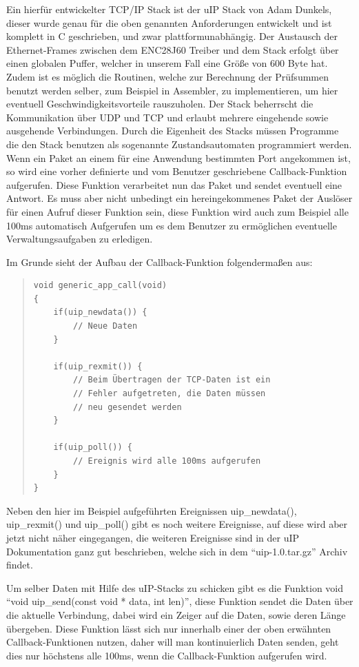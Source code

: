 \documentclass[a4paper,14pt,headsepline]{scrartcl}
\begin{document}
Ein hierfür entwickelter TCP/IP Stack ist der uIP Stack von Adam Dunkels, dieser wurde genau für die oben genannten Anforderungen entwickelt und ist komplett in C geschrieben, und zwar plattformunabhängig. Der Austausch der Ethernet-Frames zwischen dem ENC28J60 Treiber und dem Stack erfolgt über einen globalen Puffer, welcher in unserem Fall eine Größe von 600 Byte hat. Zudem ist es möglich die Routinen, welche zur Berechnung der Prüfsummen benutzt werden selber, zum Beispiel in Assembler, zu implementieren, um hier eventuell Geschwindigkeitsvorteile rauszuholen. Der Stack beherrscht die Kommunikation über UDP und TCP und erlaubt mehrere eingehende sowie ausgehende Verbindungen. Durch die Eigenheit des Stacks müssen Programme die den Stack benutzen als sogenannte Zustandsautomaten programmiert werden. Wenn ein Paket an einem für eine Anwendung bestimmten Port angekommen ist, so wird eine vorher definierte und vom Benutzer geschriebene Callback-Funktion aufgerufen. Diese Funktion verarbeitet nun das Paket und sendet eventuell eine Antwort. Es muss aber nicht unbedingt ein hereingekommenes Paket der Auslöser für einen Aufruf dieser Funktion sein, diese Funktion wird auch zum Beispiel alle 100ms automatisch Aufgerufen um es dem Benutzer zu ermöglichen eventuelle Verwaltungsaufgaben zu erledigen.

Im Grunde sieht der Aufbau der Callback-Funktion folgendermaßen aus:
\begin{quote}
\begin{verbatim}
void generic_app_call(void)
{
    if(uip_newdata()) {
        // Neue Daten
    }
    
    if(uip_rexmit()) {
        // Beim Übertragen der TCP-Daten ist ein
        // Fehler aufgetreten, die Daten müssen
        // neu gesendet werden
    }
    
    if(uip_poll()) {
        // Ereignis wird alle 100ms aufgerufen
    }
}
\end{verbatim}
\end{quote}

\newpage

Neben den hier im Beispiel aufgeführten Ereignissen uip\_newdata(), uip\_rexmit() und uip\_poll() gibt es noch weitere Ereignisse, auf diese wird aber jetzt nicht näher eingegangen, die weiteren Ereignisse sind in der uIP Dokumentation ganz gut beschrieben, welche sich in dem "`uip-1.0.tar.gz"' Archiv findet.

Um selber Daten mit Hilfe des uIP-Stacks zu schicken gibt es die Funktion void "`void uip\_send(const void * data, int len)"', diese Funktion sendet die Daten über die aktuelle Verbindung, dabei wird ein Zeiger auf die Daten, sowie deren Länge übergeben. Diese Funktion lässt sich nur innerhalb einer der oben erwähnten Callback-Funktionen nutzen, daher will man kontinuierlich Daten senden, geht dies nur höchstens alle 100ms, wenn die Callback-Funktion aufgerufen wird.
\end{document}
